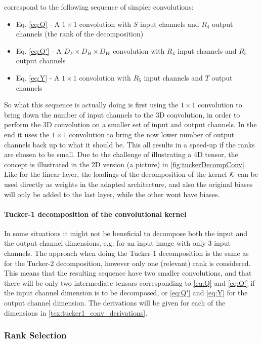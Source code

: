 correspond to the following sequence of simpler convolutions:
\begin{itemize}
    \item Eq. \eqref{eq:Q} - A $1\times 1$ convolution with $S$ input channels and $R_4$ output channels (the rank of the decomposition)
    \item Eq. \eqref{eq:Q'} - A $D_F \times D_H \times D_W$ convolution with $R_4$ input channels and $R_5$ output channels
    \item Eq. \eqref{eq:Y} - A $1\times 1$ convolution with $R_5$ input channels and $T$ output channels
\end{itemize}
So what this sequence is actually doing is first using the $1\times 1$ convolution to bring down the number of input channels to the 3D convolution, in order to perform the 3D convolution on a smaller set of input and output channels. In the end it uses the $1\times 1$ convolution to bring the now lower number of output channels back up to what it should be. This all results in a speed-up if the ranks are chosen to be small. Due to the challenge of illustrating a 4D tensor, the concept is illustrated in the 2D version (a picture) in \autoref{fig:tuckerDecompConv}. Like for the linear layer, the loadings of the decomposition of the kernel $\mathcal{K}$ can be used directly as weights in the adapted architecture, and also the original biases will only be added to the last layer, while the other wont have biases.

\paragraph{Tucker-1 decomposition of the convolutional kernel}
In some situations it might not be beneficial to decompose both the input and the output channel dimensions, e.g. for an input image with only 3 input channels. The approach when doing the Tucker-1 decomposition is the same as for the Tucker-2 decomposition, however only one (relevant) rank is considered. This means that the resulting sequence have two smaller convolutions, and that there will be only two intermediate tensors corresponding to \eqref{eq:Q} and \eqref{eq:Q'} if the input channel dimension is to be decomposed, or \eqref{eq:Q'} and \eqref{eq:Y} for the output channel dimension. The derivations will be given for each of the dimensions in \autoref{tex:tucker1_conv_derivations}.

\subsubsection{Rank Selection}

